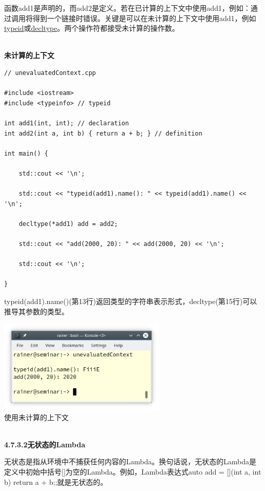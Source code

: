 函数add1是声明的，而add2是定义。若在已计算的上下文中使用add1，例如：通过调用将得到一个链接时错误。关键是可以在未计算的上下文中使用add1，例如\href{https://en.cppreference.com/w/cpp/language/typeid}{typeid}或\href{https://en.cppreference.com/w/cpp/language/decltype}{decltype}。两个操作符都接受未计算的操作数。

\hspace*{\fill} \\ %
\noindent
\textbf{未计算的上下文}
\begin{lstlisting}[style=styleCXX]
// unevaluatedContext.cpp

#include <iostream>
#include <typeinfo> // typeid

int add1(int, int); // declaration
int add2(int a, int b) { return a + b; } // definition

int main() {
	
	std::cout << '\n';
	
	std::cout << "typeid(add1).name(): " << typeid(add1).name() << '\n';
	
	decltype(*add1) add = add2;
	
	std::cout << "add(2000, 20): " << add(2000, 20) << '\n';
	
	std::cout << '\n';

}
\end{lstlisting}

typeid(add1).name()(第13行)返回类型的字符串表示形式，decltype(第15行)可以推导其参数的类型。

\begin{center}
\includegraphics[width=0.6\textwidth]{content/3/chapter4/images/43.png}\\
使用未计算的上下文
\end{center}

\hspace*{\fill} \\ %
\noindent
\textbf{4.7.3.2\hspace{0.2cm}无状态的Lambda}

无状态是指从环境中不捕获任何内容的Lambda。换句话说，无状态的Lambda是定义中初始中括号[]为空的Lambda。例如，Lambda表达式auto add = [](int a, int b) {return a + b;};就是无状态的。

